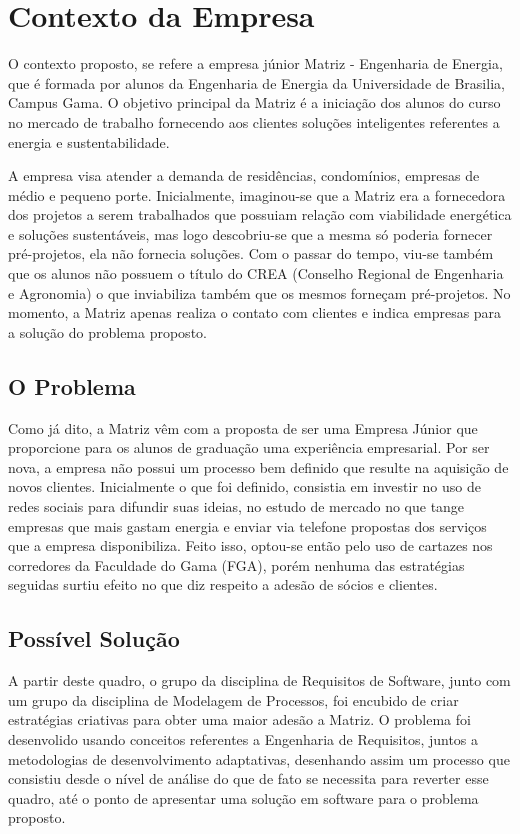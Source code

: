 \chapter[Contexto da Empresa]{Contexto da Empresa}
O contexto proposto, se refere a empresa júnior Matriz - Engenharia de Energia, que é 
formada por alunos da Engenharia de Energia da Universidade de Brasilia, Campus Gama. 
O objetivo principal da Matriz é a iniciação dos alunos do curso no mercado de trabalho 
fornecendo aos clientes soluções inteligentes referentes a energia e sustentabilidade.

A empresa visa atender a demanda de residências, condomínios, empresas de médio 
e pequeno porte. Inicialmente, imaginou-se que a Matriz era a fornecedora dos projetos a 
serem trabalhados que possuiam relação com viabilidade energética e soluções sustentáveis,
mas logo descobriu-se que a mesma só poderia fornecer pré-projetos, ela não fornecia 
soluções. Com o passar do tempo, viu-se também que os alunos não possuem o título do CREA 
(Conselho Regional de Engenharia e Agronomia) o que inviabiliza também que os mesmos forneçam 
pré-projetos. No momento, a Matriz apenas realiza o contato com clientes e indica empresas 
para a solução do problema proposto.

\section{O Problema}
Como já dito, a Matriz vêm com a proposta de ser uma Empresa Júnior que proporcione para 
os alunos de graduação uma experiência empresarial. Por ser nova, a empresa não possui 
um processo bem definido que resulte na aquisição de novos clientes. Inicialmente o que 
foi definido, consistia em investir no uso de redes sociais para difundir suas ideias, 
no estudo de mercado no que tange empresas que mais gastam energia e enviar via telefone
propostas dos serviços que a empresa disponibiliza. Feito isso, optou-se então pelo uso de
cartazes nos corredores da Faculdade do Gama (FGA), porém nenhuma das estratégias seguidas
surtiu efeito no que diz respeito a adesão de sócios e clientes.

\section{Possível Solução}
A partir deste quadro, o grupo da disciplina de Requisitos de Software, junto com um 
grupo da disciplina de Modelagem de Processos, foi encubido de criar estratégias 
criativas para obter uma maior adesão a Matriz. O problema foi desenvolido
usando conceitos referentes a Engenharia de Requisitos, juntos a metodologias de 
desenvolvimento adaptativas, desenhando assim um processo que consistiu desde o nível 
de análise do que de fato se necessita para reverter esse quadro, até o ponto de 
apresentar uma solução em software para o problema proposto.

